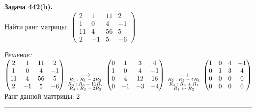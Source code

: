 \documentclass[a4paper, 12pt]{article}
\newenvironment{problem}[2][Задача]
{ \begin{mdframed}[backgroundcolor=gray!10] \textbf{#1 #2.} \\}
	{  \end{mdframed}}
\newenvironment{solution}
{\textit{Решение:}\vspace{.1cm}\\}
{\vspace{.1cm}\noindent\rule{7in}{1.5pt}}
\begin{document}
\begin{problem}{442(b)}
Найти ранг матрицы:
$\left(\begin{array}{rrrr}2 & 1 & 11 & 2\\1 & 0 & 4 & -1\\ 11 & 4 & 56 & 5 \\ 2 & -1 & 5 & -6\end{array}\right)$

\end{problem}
\begin{solution}
$
\begin{pmatrix}
	2 & 1 & 11 & 2\\
	1 & 0 & 4 & -1\\ 
	11 & 4 & 56 & 5 \\ 
	2 & -1 & 5 & -6
\end{pmatrix} \:
\underset{
\begin{subarray}{c}
	\text{$R_1: R_1-2R_2$}\\
	\text{$R_3: R_3-11R_2$}\\
	\text{$R_4: R_3-2R_2$}\\
\end{subarray}
}{\longrightarrow} \:
\begin{pmatrix}
	0 & 1 & 3 & 4\\
	1 & 0 & 4 & -1\\
	0 & 4 & 12 & 16\\
	0 & -1 & -3 & -4\\
\end{pmatrix} \:
\underset{
\begin{subarray}{c}
	\text{$R_3: R_3-4R_1$}\\
	\text{$R_4: R_4+R_1$}\\
	\text{$R_1 \leftrightarrow R_2$}\\
\end{subarray}
}{\longrightarrow} \:
\begin{pmatrix}
	1 & 0 & 4 & -1\\
	0 & 1 & 3 & 4\\
	0 & 0 & 0 & 0\\
	0 & 0 & 0 & 0\\
\end{pmatrix}
$\\

Ранг данной маттрицы: 2\\
\end{solution} 
\end{document}
